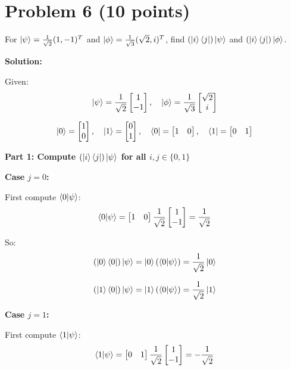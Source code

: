 \documentclass[11pt]{article}
\newenvironment{solution}
{\par\noindent\textbf{Solution:}\par}
{\vspace{1em}}
\begin{document}
\section*{Problem 6 (10 points)}

For $\ket{\psi} = \frac{1}{\sqrt{2}} (1,-1)^T$ and $\ket{\phi} = \frac{1}{\sqrt{3}} (\sqrt{2},i)^T$, find $(\ket{i}\bra{j})\ket{\psi}$ and $(\ket{i}\bra{j})\ket{\phi}$.

\begin{solution}

Given:
\[\ket{\psi} = \frac{1}{\sqrt{2}}\begin{bmatrix}1 \\ -1\end{bmatrix}, \quad \ket{\phi} = \frac{1}{\sqrt{3}}\begin{bmatrix}\sqrt{2} \\ i\end{bmatrix}\]

\[\ket{0} = \begin{bmatrix}1 \\ 0\end{bmatrix}, \quad \ket{1} = \begin{bmatrix}0 \\ 1\end{bmatrix}, \quad \bra{0} = \begin{bmatrix}1 & 0\end{bmatrix}, \quad \bra{1} = \begin{bmatrix}0 & 1\end{bmatrix}\]

\textbf{Part 1: Compute $(\ket{i}\bra{j})\ket{\psi}$ for all $i,j \in \{0,1\}$}

\textbf{Case $j=0$:}

First compute $\bra{0}\ket{\psi}$:
\[\bra{0}\ket{\psi} = \begin{bmatrix}1 & 0\end{bmatrix}\frac{1}{\sqrt{2}}\begin{bmatrix}1 \\ -1\end{bmatrix} = \frac{1}{\sqrt{2}}\]

So:
\[(\ket{0}\bra{0})\ket{\psi} = \ket{0}(\bra{0}\ket{\psi}) = \frac{1}{\sqrt{2}}\ket{0}\]

\[(\ket{1}\bra{0})\ket{\psi} = \ket{1}(\bra{0}\ket{\psi}) = \frac{1}{\sqrt{2}}\ket{1}\]

\textbf{Case $j=1$:}

First compute $\bra{1}\ket{\psi}$:
\[\bra{1}\ket{\psi} = \begin{bmatrix}0 & 1\end{bmatrix}\frac{1}{\sqrt{2}}\begin{bmatrix}1 \\ -1\end{bmatrix} = -\frac{1}{\sqrt{2}}\]


\end{solution}
\end{document}
